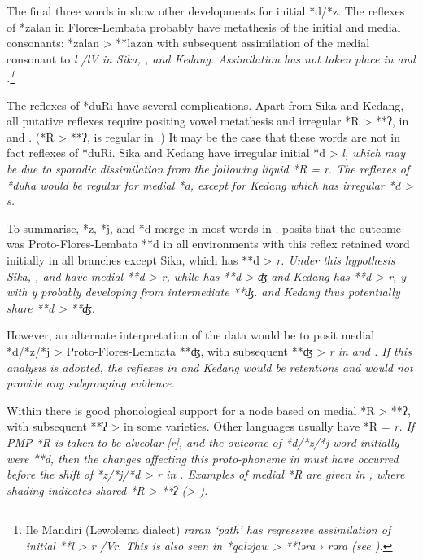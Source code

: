 The final three words in  show other
developments for initial *d/*z.
The reflexes of *zalan in Flores-Lembata probably have metathesis
of the initial and medial consonants: *zalan > **lazan with subsequent assimilation
of the medial consonant to \it{l} /lV{\gap} in Sika,
, and Kedang.
Assimilation has not taken place in 
and .\footnote{ 
		Ile Mandiri (Lewolema dialect) \it{raran} ‘path’ has regressive
		assimilation of initial **l > \it{r} /{\gap}Vr.
		This is also seen in *qaləjaw > **ləra › \it{rəra} (see ).}

The reflexes of *duRi have several complications.
Apart from Sika and Kedang, all putative reflexes require positing
vowel metathesis and irregular *R > **ʔ,
{\0} in  and .
(*R > **ʔ, {\0} is regular in .) It may be
the case that these words are not in fact reflexes of *duRi.
Sika and Kedang have irregular initial *d > \it{l},
which may be due to sporadic dissimilation from the following
liquid *R = \it{r}.
The reflexes of *duha would be regular for medial *d,
except for Kedang which has irregular *d > \it{s}.

To summarise, *z, *j, and *d merge in most words in .
\citet{Fricke2019} posits that the outcome was Proto-Flores-Lembata
**d in all environments with this reflex retained word initially
in all branches except Sika,
which has **d > \it{r}.
Under this hypothesis Sika,
, and  have medial **d
> \it{r}, while  has **d > \it{ʤ}
and Kedang has **d > \it{r,
y} -- with \it{y} probably developing from intermediate **ʤ.
 and Kedang thus potentially share **d > **ʤ.

\largerpage
However, an alternate interpretation of the data would be to
posit medial *d/*z/*j > Proto-Flores-Lembata **ʤ,
with subsequent **ʤ > \it{r} in  and .
If this analysis is adopted,
the reflexes in 
and Kedang would be retentions
and would not provide any subgrouping evidence.

Within  there is good phonological support
for a  node based on medial *R > **ʔ,
with subsequent **ʔ > {\0} in some varieties.
Other  languages usually have *R = \it{r}.
If PMP *R is taken to be alveolar [r],
and the outcome of *d/*z/*j word initially were **d,
then the changes affecting this proto-phoneme in 
must have occurred before the shift of *z/*j/*d > \it{r} in .
Examples of medial *R are given in ,
where shading indicates shared *R > **ʔ (> {\0}).

